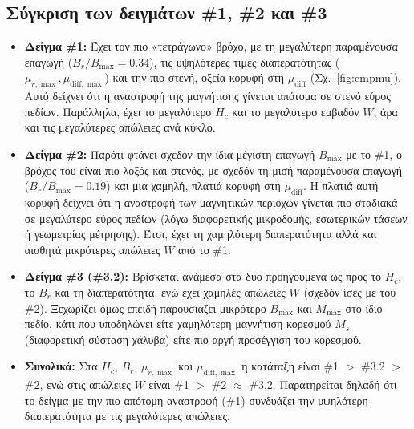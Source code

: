 \documentclass[11pt,a4paper]{article}
\newcommand{\diff}{\mathrm{diff}}
\begin{document}
\subsection{Σύγκριση των δειγμάτων \textlatin{\#}1, \textlatin{\#}2 και \textlatin{\#}3}
\begin{itemize}
 \item \textbf{Δείγμα \textlatin{\#}1:} Έχει τον πιο «τετράγωνο» βρόχο, με τη μεγαλύτερη παραμένουσα επαγωγή ($B_r/B_{\max}=0.34$), τις υψηλότερες τιμές διαπερατότητας ($\mu_{r,\max}, \mu_{\diff,\max}$) και την πιο στενή, οξεία κορυφή στη $\mu_\diff$ (Σχ.~\ref{fig:cmpmu}). Αυτό δείχνει ότι η αναστροφή της μαγνήτισης γίνεται απότομα σε στενό εύρος πεδίων. Παράλληλα, έχει το μεγαλύτερο $H_c$ και το μεγαλύτερο εμβαδόν $W$, άρα και τις μεγαλύτερες απώλειες ανά κύκλο.
 \item \textbf{Δείγμα \textlatin{\#}2:} Παρότι φτάνει σχεδόν την ίδια μέγιστη επαγωγή $B_{\max}$ με το \textlatin{\#}1, ο βρόχος του είναι πιο λοξός και στενός, με σχεδόν τη μισή παραμένουσα επαγωγή ($B_r/B_{\max}=0.19$) και μια χαμηλή, πλατιά κορυφή στη $\mu_\diff$. Η πλατιά αυτή κορυφή δείχνει ότι η αναστροφή των μαγνητικών περιοχών γίνεται πιο σταδιακά σε μεγαλύτερο εύρος πεδίων (λόγω διαφορετικής μικροδομής, εσωτερικών τάσεων ή γεωμετρίας μέτρησης). Έτσι, έχει τη χαμηλότερη διαπερατότητα αλλά και αισθητά μικρότερες απώλειες $W$ από το \textlatin{\#}1.
 \item \textbf{Δείγμα \textlatin{\#}3 (\textlatin{\#}3.2):} Βρίσκεται ανάμεσα στα δύο προηγούμενα ως προς το $H_c$, το $B_r$ και τη διαπερατότητα, ενώ έχει χαμηλές απώλειες $W$ (σχεδόν ίσες με του \textlatin{\#}2). Ξεχωρίζει όμως επειδή παρουσιάζει μικρότερο $B_{\max}$ και $M_{\max}$ στο ίδιο πεδίο, κάτι που υποδηλώνει είτε χαμηλότερη μαγνήτιση κορεσμού $M_s$ (διαφορετική σύσταση χάλυβα) είτε πιο αργή προσέγγιση του κορεσμού.
 \item \textbf{Συνολικά:} Στα $H_c$, $B_r$, $\mu_{r,\max}$ και $\mu_{\diff,\max}$ η κατάταξη είναι \textlatin{\#}1 $>$ \textlatin{\#}3.2 $>$ \textlatin{\#}2, ενώ στις απώλειες $W$ είναι \textlatin{\#}1 $>$ \textlatin{\#}2 $\approx$ \textlatin{\#}3.2. Παρατηρείται δηλαδή ότι το δείγμα με την πιο απότομη αναστροφή (\textlatin{\#}1) συνδυάζει την υψηλότερη διαπερατότητα με τις μεγαλύτερες απώλειες.
\end{itemize}
\end{document}
